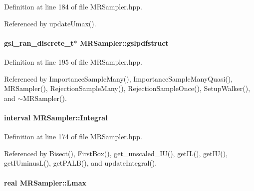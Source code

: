 \-Definition at line 184 of file \-M\-R\-Sampler.\-hpp.



\-Referenced by update\-Umax().

\hypertarget{classMRSampler_aeb2b7cd2e8b2459ed444a38b327897fd}{
\paragraph[{gslpdfstruct}]{\setlength{\rightskip}{0pt plus 5cm}gsl\-\_\-ran\-\_\-discrete\-\_\-t$\ast$ {\bf \-M\-R\-Sampler\-::gslpdfstruct}}}\label{classMRSampler_aeb2b7cd2e8b2459ed444a38b327897fd}


\-Definition at line 195 of file \-M\-R\-Sampler.\-hpp.



\-Referenced by \-Importance\-Sample\-Many(), \-Importance\-Sample\-Many\-Quasi(), \-M\-R\-Sampler(), \-Rejection\-Sample\-Many(), \-Rejection\-Sample\-Once(), \-Setup\-Walker(), and $\sim$\-M\-R\-Sampler().

\hypertarget{classMRSampler_ada8a56adf645018f986090ca485049f5}{
\paragraph[{\-Integral}]{\setlength{\rightskip}{0pt plus 5cm}interval {\bf \-M\-R\-Sampler\-::\-Integral}}}\label{classMRSampler_ada8a56adf645018f986090ca485049f5}


\-Definition at line 174 of file \-M\-R\-Sampler.\-hpp.



\-Referenced by \-Bisect(), \-First\-Box(), get\-\_\-unscaled\-\_\-\-I\-U(), get\-I\-L(), get\-I\-U(), get\-I\-Uminus\-L(), get\-P\-A\-L\-B(), and update\-Integral().

\hypertarget{classMRSampler_a977efd8e3ab58d4e88bc647e68460071}{
\paragraph[{\-Lmax}]{\setlength{\rightskip}{0pt plus 5cm}real {\bf \-M\-R\-Sampler\-::\-Lmax}}}\label{classMRSampler_a977efd8e3ab58d4e88bc647e68460071}


